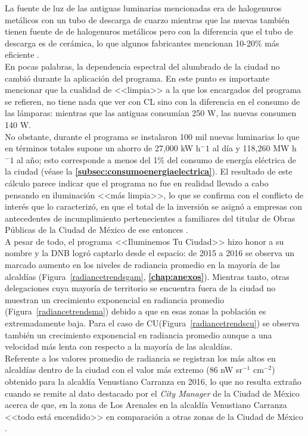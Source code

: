 La fuente de luz de las antiguas luminarias mencionadas era de halogenuros metálicos con un tubo de descarga de cuarzo mientras que las nuevas también tienen fuente de de halogenuros metálicos pero con la diferencia que el tubo de descarga es de cerámica, lo que algunos fabricantes mencionan 10-20\% más eficiente \citep{EMB2007}.\\

En pocas palabras, la dependencia espectral del alumbrado de la ciudad no cambió durante la aplicación del programa. En este punto es importante mencionar que la cualidad de <<limpia>> a la que los encargados del programa se refieren, no tiene nada que ver con CL sino con la diferencia en el consumo de las lámparas: mientras que las antiguas consumían 250 W, las nuevas consumen 140 W.\\ 

No obstante, durante el programa se instalaron 100 mil nuevas luminarias lo que en términos totales supone un ahorro de 27,000 kW h$^-1$ al día y 118,260 MW h$^-1$ al año; esto corresponde a menos del 1\% del consumo de energía eléctrica de la ciudad (véase la \textbf{\autoref{subsec:consumoenergiaelectrica}}). El resultado de este cálculo parece indicar que el programa no fue en realidad llevado a cabo pensando en iluminación <<más limpia>>, lo que se confirma con el conflicto de interés que lo caracterizó, en que el total de la inversión se asignó a empresas con antecedentes de incumplimiento pertenecientes a familiares del titular de Obras Públicas de la Ciudad de México de ese entonces \citep{Sinembargo2015}.\\ 

A pesar de todo, el programa <<Iluminemos Tu Ciudad>> hizo honor a su nombre y la DNB logró captarlo desde el espacio: de 2015 a 2016 se observa un marcado aumento en los niveles de radiancia promedio en la mayoría de las alcaldías (Figura~\ref{radiancetrendsgam}, \textbf{\autoref{chap:anexos}}). Mientras tanto, otras delegaciones cuya mayoría de territorio se encuentra fuera de la ciudad no muestran un crecimiento exponencial en radiancia promedio (Figura~\ref{radiancetrendsma}) debido a que en esas zonas la población es extremadamente baja. Para el caso de CU(Figura~\ref{radiancetrendscu}) se observa también un crecimiento exponencial en radiancia promedio aunque a una velocidad más lenta con respecto a la mayoría de las alcaldías.\\ 


Referente a los valores promedio de radiancia se registran los más altos en alcaldías dentro de la ciudad con el valor más extremo (86 nW sr$^{-1}$  cm$^{-2}$) obtenido para la alcaldía Venustiano Carranza en 2016, lo que no resulta extraño cuando se remite al dato destacado por el \textit{City Manager} de la Ciudad de México acerca de que, en la zona de Los Arenales en la alcaldía Venustiano Carranza <<todo está encendido>> en comparación a otras zonas de la Ciudad de México \citep{Universal2017}.\\

